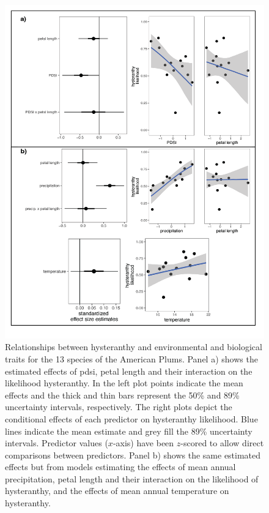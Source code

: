 \documentclass{article}[12pt]
\begin{document}
{\begin{figure}[h!]
    \label{fig:ordinals}
\end{figure}




\begin{figure}[h!]
    \centering
 \includegraphics[width=.95\textwidth]{..//..//Plots/investfig3-01.png}
    \caption{Relationships between hysteranthy and environmental and biological traits for the 13 species of the American Plums. Panel a) shows the estimated effects of pdsi, petal length and their interaction on the likelihood hysteranthy. In the left plot points indicate the mean effects and the thick and thin bars represent the 50\% and 89\% uncertainty intervals, respectively. The right plots depict the conditional effects of each predictor on hysteranthy likelihood. Blue lines indicate the mean estimate and grey fill the 89\% uncertainty intervals. Predictor values ($x$-axis) have been $z$-scored to allow direct comparisons between predictors. Panel b) shows the same estimated effects but from models estimating the effects of mean annual precipitation, petal length and their interaction on the likelihood of hysteranthy, and the effects of mean annual temperature on hysteranthy.}
    \label{fig:prunes}
\end{figure}


}
\end{document}
